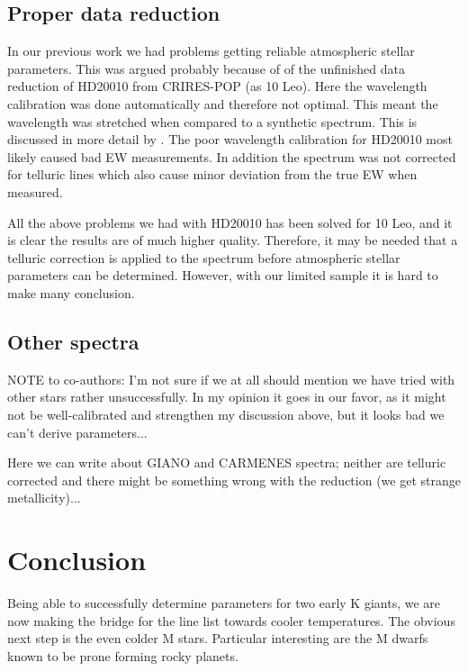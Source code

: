 \documentclass{aa}
\begin{document}
\subsection{Proper data reduction}

In our previous work we had problems getting reliable atmospheric stellar
parameters. This was argued probably because of of the unfinished data reduction
of HD20010 from CRIRES-POP (as 10 Leo). Here the wavelength calibration was done
automatically and therefore not optimal. This meant the wavelength was stretched
when compared to a synthetic spectrum. This is discussed in more detail by
\citet{Nicholls2016}. The poor wavelength calibration for HD20010 most likely
caused bad EW measurements. In addition the spectrum was not corrected for
telluric lines which also cause minor deviation from the true EW when measured.

All the above problems we had with HD20010 has been solved for 10 Leo, and it is
clear the results are of much higher quality. Therefore, it may be needed that a
telluric correction is applied to the spectrum before atmospheric stellar
parameters can be determined. However, with our limited sample it is hard to
make many conclusion.

\subsection{Other spectra}

NOTE to co-authors: I'm not sure if we at all should mention we have tried with
other stars rather unsuccessfully. In my opinion it goes in our favor, as it
might not be well-calibrated and strengthen my discussion above, but it looks
bad we can't derive parameters...

Here we can write about GIANO and CARMENES spectra; neither are telluric
corrected and there might be something wrong with the reduction (we get strange
metallicity)...





\section{Conclusion}
\label{sec:conclusion}

Being able to successfully determine parameters for two early K giants, we are
now making the bridge for the line list towards cooler temperatures. The obvious
next step is the even colder M stars. Particular interesting are the M dwarfs
known to be prone forming rocky planets.
\end{document}
